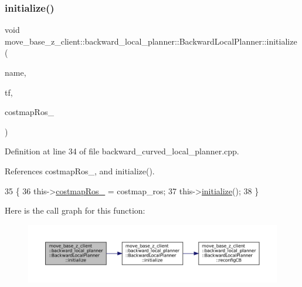 \subsubsection{\texorpdfstring{initialize()}{initialize()}\hspace{0.1cm}{\footnotesize\ttfamily [2/3]}}
{\footnotesize\ttfamily void move\+\_\+base\+\_\+z\+\_\+client\+::backward\+\_\+local\+\_\+planner\+::\+Backward\+Local\+Planner\+::initialize (\begin{DoxyParamCaption}\item[{std\+::string}]{name,  }\item[{tf2\+\_\+ros\+::\+Buffer $\ast$}]{tf,  }\item[{costmap\+\_\+2d\+::\+Costmap2\+D\+R\+OS $\ast$}]{costmap\+Ros\+\_\+ }\end{DoxyParamCaption})}



Definition at line 34 of file backward\+\_\+curved\+\_\+local\+\_\+planner.\+cpp.



References costmap\+Ros\+\_\+, and initialize().


\begin{DoxyCode}
35 \{
36     this->\hyperlink{classmove__base__z__client_1_1backward__local__planner_1_1BackwardLocalPlanner_a865618f84238fe6ff437d1e38ec5fec0}{costmapRos\_} = costmap\_ros;
37     this->\hyperlink{classmove__base__z__client_1_1backward__local__planner_1_1BackwardLocalPlanner_acdb083587fd77dc2c8d617751ac08f74}{initialize}();
38 \}
\end{DoxyCode}
Here is the call graph for this function\+:
\nopagebreak
\begin{figure}[H]
\begin{center}
\leavevmode
\includegraphics[width=350pt]{classmove__base__z__client_1_1backward__local__planner_1_1BackwardLocalPlanner_ad31278d3b0f2d990c5e5fe440809c864_cgraph}
\end{center}
\end{figure}
\mbox{\label{classmove__base__z__client_1_1backward__local__planner_1_1BackwardLocalPlanner_acdb083587fd77dc2c8d617751ac08f74}} 
